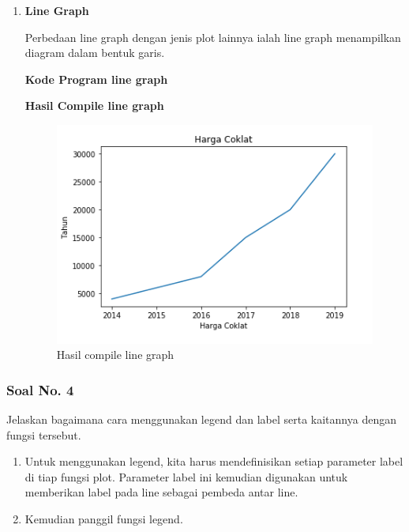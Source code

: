 \begin{enumerate}
	\item \textbf{Line Graph}
	
	Perbedaan line graph dengan jenis plot lainnya ialah line graph menampilkan diagram dalam bentuk garis.
	
	\textbf{Kode Program line graph}
	
	
	
	\textbf{Hasil Compile line graph}
	
	\begin{figure}[H]
		\includegraphics{figures/6/1174021/35.png}
		\centering
		\caption{Hasil compile line graph}
	\end{figure}
	
\end{enumerate}

\subsubsection{Soal No. 4}
\hfill \break
Jelaskan bagaimana cara menggunakan legend dan label serta kaitannya dengan fungsi tersebut.

\begin{enumerate}
	\item Untuk menggunakan legend, kita harus mendefinisikan setiap parameter label di tiap fungsi plot. Parameter label ini kemudian digunakan untuk memberikan label pada line sebagai pembeda antar line.
	
	
	
	\item Kemudian panggil fungsi legend.
	
	
\end{enumerate}

